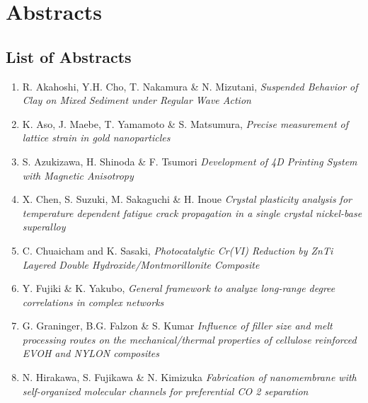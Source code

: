 \section{Abstracts}
\subsection*{List of Abstracts}
\begin{enumerate}[label=A\arabic*]

\item R. Akahoshi,  Y.H. Cho, T. Nakamura  \& N. Mizutani, {\em Suspended Behavior of Clay on Mixed Sediment
under Regular Wave Action}

\item K. Aso, J. Maebe, T. Yamamoto \& S. Matsumura, {\em Precise measurement of lattice strain in gold
nanoparticles}

\item S. Azukizawa, H. Shinoda \&  F. Tsumori {\em Development of 4D Printing System
with Magnetic Anisotropy}

\item X. Chen, S. Suzuki,  M. Sakaguchi \& H. Inoue {\em Crystal plasticity analysis for temperature
dependent fatigue crack propagation in a single
crystal nickel-base superalloy}

\item C. Chuaicham and K. Sasaki, {\em Photocatalytic Cr(VI) Reduction by ZnTi Layered
Double Hydroxide/Montmorillonite Composite}

\item Y. Fujiki \& K. Yakubo, {\em General framework to analyze long-range
degree correlations in complex networks}

\item G. Graninger, B.G. Falzon \& S. Kumar {\em Influence of filler size and melt processing routes
on the mechanical/thermal properties of cellulose
reinforced EVOH and NYLON composites}

\item N. Hirakawa, S. Fujikawa \& N. Kimizuka {\em Fabrication of nanomembrane
with self-organized molecular channels
for preferential CO 2 separation}


\end{enumerate}
